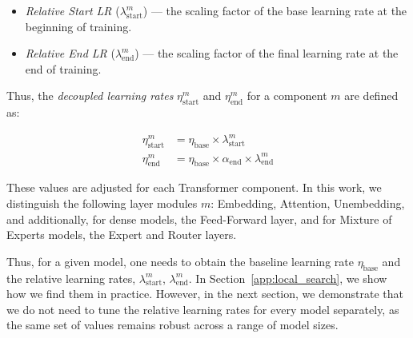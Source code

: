 \documentclass{article}
\theoremstyle{plain}
\theoremstyle{definition}
\theoremstyle{remark}
\begin{document}
    \begin{itemize} [topsep=0pt, leftmargin=*]
    \item \textit{Relative Start LR} ($\lambda_{\text{start}}^m$) --- the scaling factor of the base learning rate at the beginning of training. 
    
    \item \textit{Relative End LR} ($\lambda_{\text{end}}^m$) --- the scaling factor of the final learning rate at the end of training. 
    \end{itemize}
    
    Thus, the \textit{decoupled learning rates} $\eta_{\text{start}}^m$ and $\eta_{\text{end}}^m$ for a component $m$ are defined as:
    
    
    
    \begin{align}
    \eta_{\text{start}}^m &= \eta_{\text{base}} \times \lambda_{\text{start}}^m \\
    \eta_{\text{end}}^m &= \eta_{\text{base}} \times \alpha_{\text{end}} \times \lambda_{\text{end}}^m
    \end{align}
    
    These values are adjusted for each Transformer component. In this work, we distinguish the following layer modules $m$: Embedding, Attention, Unembedding, and additionally, for dense models, the Feed-Forward layer, and for Mixture of Experts models, the Expert and Router layers.
    
    
    Thus, for a given model, one needs to obtain the baseline learning rate $\eta_{\text{base}}$ and the relative learning rates, $\lambda_{\text{start}}^m$, $\lambda_{\text{end}}^m$. In Section~\ref{app:local_search}, we show how we find them in practice. However, in the next section, we demonstrate that we do not need to tune the relative learning rates for every model separately, as the same set of values remains robust across a range of model sizes. 
    
\end{document}

